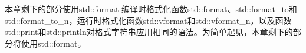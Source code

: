 \begin{myNotic}{本章剩下的部分使用std::format}
编译时格式化函数std::format、std::format\_to和std::format\_to\_n，运行时格式化函数std::vformat和std::vformat\_n，以及函数std::print和std::println对格式字符串应用相同的语法。为简单起见，本章剩下的部分将使用std::format。
\end{myNotic}
































